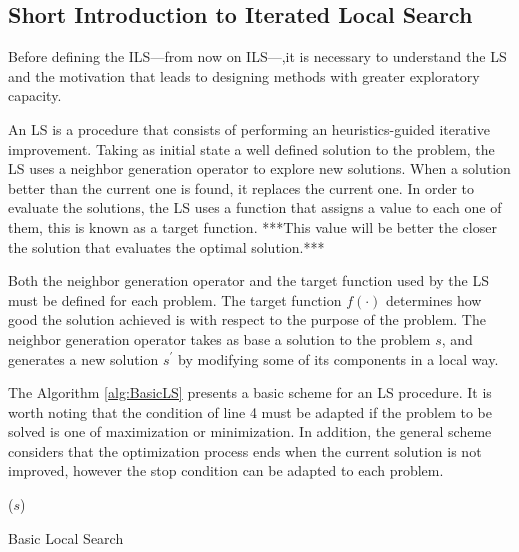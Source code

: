 \subsection{Short Introduction to Iterated Local Search}

Before defining the \acs{ILS}---from now on \acs{ILS}---,it is necessary to understand the \acs{LS} and the motivation that leads to designing methods with greater exploratory capacity.

An \acs{LS} is a procedure that consists of performing an heuristics-guided iterative improvement. Taking as initial state a well defined solution to the problem, the \acs{LS} uses a neighbor generation operator to explore new solutions. When a solution better than the current one is found, it replaces the current one. In order to evaluate the solutions, the \acs{LS} uses a function that assigns a value to each one of them, this is known as a target function. ***This value will be better the closer the solution that evaluates the optimal solution.*** 

Both the neighbor generation operator and the target function used by the \acs{LS} must be defined for each problem. The target function $f(\cdot)$ determines how good the solution achieved is with respect to the purpose of the problem. The neighbor generation operator takes as base a solution to the problem $s$, and generates a new solution $s^\prime$ by modifying some of its components in a local way.

The Algorithm \ref{alg:BasicLS} presents a basic scheme for an \acs{LS} procedure. It is worth noting that the condition of line 4 must be adapted if the problem to be solved is one of maximization or minimization. In addition, the general scheme considers that the optimization process ends when the current solution is not improved, however the stop condition can be adapted to each problem.

\begin{algorithm}
	\SetNlSkip{0.5em}
	\BlankLine
	\BlankLine
	\KwRet ($s$)
	
	\caption{Basic Local Search}\label{alg:BasicLS}
\end{algorithm}

